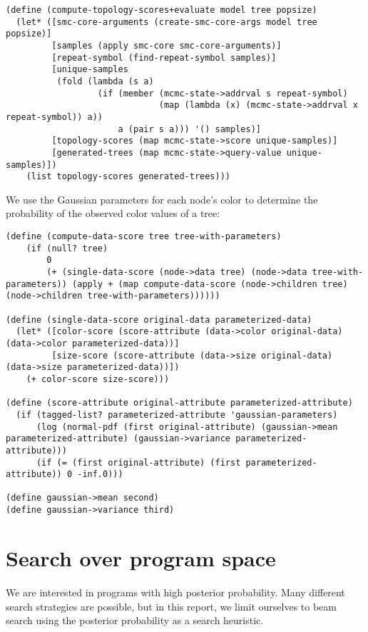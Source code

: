 \documentclass[a4paper,10pt]{article}
\begin{document}
\begin{lstlisting}[frame=trbl]
(define (compute-topology-scores+evaluate model tree popsize)
  (let* ([smc-core-arguments (create-smc-core-args model tree popsize)]
         [samples (apply smc-core smc-core-arguments)]
         [repeat-symbol (find-repeat-symbol samples)]
         [unique-samples
          (fold (lambda (s a)
                  (if (member (mcmc-state->addrval s repeat-symbol)
                              (map (lambda (x) (mcmc-state->addrval x repeat-symbol)) a))
                      a (pair s a))) '() samples)]
         [topology-scores (map mcmc-state->score unique-samples)]
         [generated-trees (map mcmc-state->query-value unique-samples)])
    (list topology-scores generated-trees)))
\end{lstlisting}
We use the Gaussian parameters for each node's color to determine the probability of the observed color values of a tree:
\begin{lstlisting}[frame=trbl]
(define (compute-data-score tree tree-with-parameters)
    (if (null? tree)
        0
        (+ (single-data-score (node->data tree) (node->data tree-with-parameters)) (apply + (map compute-data-score (node->children tree) (node->children tree-with-parameters))))))

(define (single-data-score original-data parameterized-data)
  (let* ([color-score (score-attribute (data->color original-data) (data->color parameterized-data))]
         [size-score (score-attribute (data->size original-data) (data->size parameterized-data))])
    (+ color-score size-score)))

(define (score-attribute original-attribute parameterized-attribute)
  (if (tagged-list? parameterized-attribute 'gaussian-parameters)
      (log (normal-pdf (first original-attribute) (gaussian->mean parameterized-attribute) (gaussian->variance parameterized-attribute)))
      (if (= (first original-attribute) (first parameterized-attribute)) 0 -inf.0)))

(define gaussian->mean second)
(define gaussian->variance third)
\end{lstlisting}


\newpage
\section{Search over program space}

We are interested in programs with high posterior probability. Many different search strategies are possible, but in this report, we limit ourselves to beam search using the posterior probability as a search heuristic.
\end{document}
